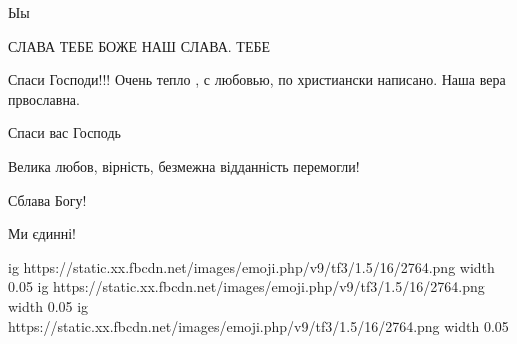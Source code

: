 \begin{itemize}
Ыы

 

 
СЛАВА ТЕБЕ БОЖЕ НАШ СЛАВА. ТЕБЕ

 
Спаси Господи!!! Очень тепло , с любовью, по христиански написано. Наша вера првославна.

 
Спаси вас Господь

 
Велика любов, вірність, безмежна відданність перемогли!

Сблава Богу!

Ми єдинні!

\ifcmt
  ig https://static.xx.fbcdn.net/images/emoji.php/v9/tf3/1.5/16/2764.png
  width 0.05
  ig https://static.xx.fbcdn.net/images/emoji.php/v9/tf3/1.5/16/2764.png
  width 0.05
  ig https://static.xx.fbcdn.net/images/emoji.php/v9/tf3/1.5/16/2764.png
  width 0.05
\fi

 

\end{itemize}
